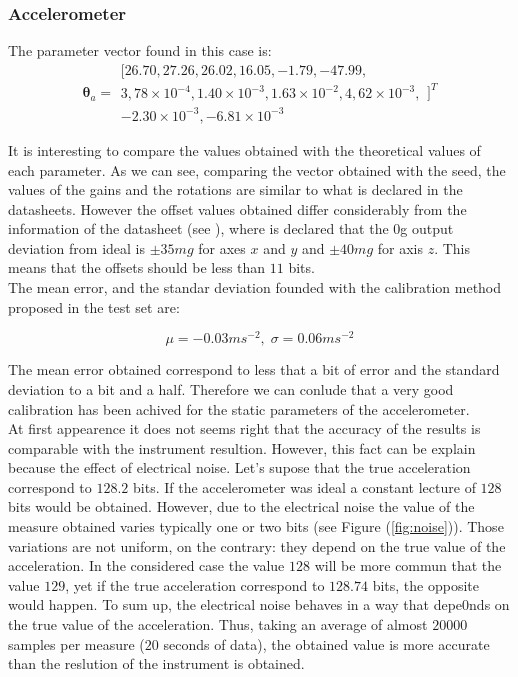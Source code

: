 \documentclass[conference]{IEEEtran}
\newcommand{\refp}[1]{(\ref{#1})}
\begin{document}
\subsubsection{Accelerometer}
The parameter vector found in this case is:
\begin{equation}
\boldsymbol{\theta}_a = \begin{array}{c}
[26.70, 27.26, 26.02, 16.05, -1.79, -47.99,\\
 3,78\times 10^{-4}, 1.40\times 10^{-3}, 1.63 \times 10^{-2},  4,62 \times 10^{-3},\\ -2.30\times 10^{-3}, -6.81 \times 10^{-3}
\end{array}]^T
\end{equation}

It is interesting to compare the values obtained with the theoretical values of each parameter. As we can see, comparing the vector obtained with the seed, the values of the gains and the rotations are similar to what is declared in the datasheets. However the offset values obtained differ considerably from the information of the datasheet (see \cite{bib:acc_data}), where is declared that the 0g output deviation from ideal is $\pm 35 mg$ for axes $x$ and $y$ and $\pm 40mg$ for axis $z$. This means that the offsets should be less than $11$ bits.\\

The mean error, and the standar deviation founded with the calibration method proposed in the test set are:

\begin{equation}
\mu = -0.03ms^{-2}, \; \sigma = 0.06ms^{-2}
\end{equation}

The mean error obtained correspond to less that a bit of error and the standard deviation to a bit and a half. Therefore we can conlude that a very good calibration has been achived for the static parameters of the accelerometer.\\

At first appearence it does not seems right that the accuracy of the results is comparable with the instrument resultion. However, this fact can be explain because the effect of electrical noise. Let's supose that the true acceleration correspond to $128.2$ bits. If the accelerometer was ideal a constant lecture of $128$ bits would be obtained. However, due to the electrical noise the value of the measure obtained varies typically one or two bits (see Figure \refp{fig:noise}). Those variations are not uniform, on the contrary: they depend on the true value of the acceleration. In the considered case the value $128$ will be more commun that the value $129$, yet if the true acceleration correspond to $128.74$ bits, the opposite would happen. To sum up, the electrical noise behaves in a way that depe0nds on the true value of the acceleration. Thus, taking an average of almost $20000$ samples per measure ($20$ seconds of data), the obtained value is more accurate than the reslution of the instrument is obtained. 
\end{document}
